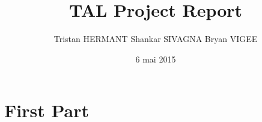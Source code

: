 \documentclass{report}
\title{TAL Project Report}
\author{Tristan HERMANT Shankar SIVAGNA Bryan VIGEE}
\date{6 mai 2015}
\begin{document}
\maketitle
\frontmatter
\mainmatter
\backmatter
\part{First Part}
\end{document}
